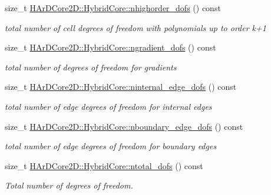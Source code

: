 \begin{DoxyCompactItemize}
\mbox{\label{group__HybridCore_ga57c23358c4ca7e485e8382c6b2761ad5}} 
size\+\_\+t \hyperlink{group__HybridCore_ga57c23358c4ca7e485e8382c6b2761ad5}{H\+Ar\+D\+Core2\+D\+::\+Hybrid\+Core\+::nhighorder\+\_\+dofs} () const
\begin{DoxyCompactList}\small\item\em total number of cell degrees of freedom with polynomials up to order k+1 \end{DoxyCompactList}\item 
\mbox{\label{group__HybridCore_gaffe520cbcf3d8212a503d51f11c13e5f}} 
size\+\_\+t \hyperlink{group__HybridCore_gaffe520cbcf3d8212a503d51f11c13e5f}{H\+Ar\+D\+Core2\+D\+::\+Hybrid\+Core\+::ngradient\+\_\+dofs} () const
\begin{DoxyCompactList}\small\item\em total number of degrees of freedom for gradients \end{DoxyCompactList}\item 
\mbox{\label{group__HybridCore_ga95c76303ee1dabc5c78f0bdd7a2c6aaa}} 
size\+\_\+t \hyperlink{group__HybridCore_ga95c76303ee1dabc5c78f0bdd7a2c6aaa}{H\+Ar\+D\+Core2\+D\+::\+Hybrid\+Core\+::ninternal\+\_\+edge\+\_\+dofs} () const
\begin{DoxyCompactList}\small\item\em total number of edge degrees of freedom for internal edges \end{DoxyCompactList}\item 
\mbox{\label{group__HybridCore_ga4e7b0325c0966ec722fe8808048fb3ab}} 
size\+\_\+t \hyperlink{group__HybridCore_ga4e7b0325c0966ec722fe8808048fb3ab}{H\+Ar\+D\+Core2\+D\+::\+Hybrid\+Core\+::nboundary\+\_\+edge\+\_\+dofs} () const
\begin{DoxyCompactList}\small\item\em total number of edge degrees of freedom for boundary edges \end{DoxyCompactList}\item 
\mbox{\label{group__HybridCore_gaf887b486ad0eea60382e306f1487b44a}} 
size\+\_\+t \hyperlink{group__HybridCore_gaf887b486ad0eea60382e306f1487b44a}{H\+Ar\+D\+Core2\+D\+::\+Hybrid\+Core\+::ntotal\+\_\+dofs} () const
\begin{DoxyCompactList}\small\item\em Total number of degrees of freedom. \end{DoxyCompactList}\item 

\end{DoxyCompactItemize}
